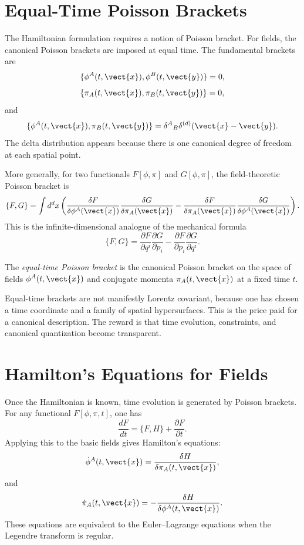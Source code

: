 \section{Equal-Time Poisson Brackets}

The Hamiltonian formulation requires a notion of Poisson bracket. For fields,
the canonical Poisson brackets are imposed at equal time. The fundamental
brackets are
\[
    \{\phi^A(t,\vect{x}),\phi^B(t,\vect{y})\}=0,
\]
\[
    \{\pi_A(t,\vect{x}),\pi_B(t,\vect{y})\}=0,
\]
and
\[
    \{\phi^A(t,\vect{x}),\pi_B(t,\vect{y})\}
    =\delta^A{}_B\delta^{(d)}(\vect{x}-\vect{y}).
\]
The delta distribution appears because there is one canonical degree of freedom
at each spatial point.

More generally, for two functionals \(F[\phi,\pi]\) and \(G[\phi,\pi]\), the
field-theoretic Poisson bracket is
\[
    \{F,G\}
    =\int d^d x\left(
        \frac{\delta F}{\delta\phi^A(\vect{x})}
        \frac{\delta G}{\delta\pi_A(\vect{x})}
        -
        \frac{\delta F}{\delta\pi_A(\vect{x})}
        \frac{\delta G}{\delta\phi^A(\vect{x})}
    \right).
\]
This is the infinite-dimensional analogue of the mechanical formula
\[
    \{F,G\}
    =\frac{\partial F}{\partial q^i}\frac{\partial G}{\partial p_i}
    -\frac{\partial F}{\partial p_i}\frac{\partial G}{\partial q^i}.
\]

\begin{definitionbox}
The \emph{equal-time Poisson bracket} is the canonical Poisson bracket on the
space of fields \(\phi^A(t,\vect{x})\) and conjugate momenta
\(\pi_A(t,\vect{x})\) at a fixed time \(t\).
\end{definitionbox}

Equal-time brackets are not manifestly Lorentz covariant, because one has chosen
a time coordinate and a family of spatial hypersurfaces. This is the price paid
for a canonical description. The reward is that time evolution, constraints, and
canonical quantization become transparent.

\section{Hamilton's Equations for Fields}

Once the Hamiltonian is known, time evolution is generated by Poisson brackets.
For any functional \(F[\phi,\pi,t]\), one has
\[
    \frac{dF}{dt}=\{F,H\}+\frac{\partial F}{\partial t}.
\]
Applying this to the basic fields gives Hamilton's equations:
\[
    \dot\phi^A(t,\vect{x})
    =\frac{\delta H}{\delta\pi_A(t,\vect{x})},
\]
and
\[
    \dot\pi_A(t,\vect{x})
    =-\frac{\delta H}{\delta\phi^A(t,\vect{x})}.
\]
These equations are equivalent to the Euler--Lagrange equations when the
Legendre transform is regular.


